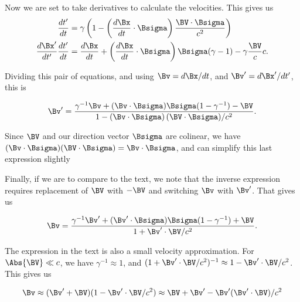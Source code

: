 {Now we are set to take derivatives to calculate the velocities.  This gives us
\begin{subequations}
\begin{equation}\label{eqn:relativisticElectrodynamicsA1:230}
\begin{aligned}
\frac{dt'}{dt} &= \gamma \left( 1 - \left( \frac{d\Bx}{dt} \cdot \Bsigma \right) \frac{\BV \cdot \Bsigma}{c^2} \right) \\
\frac{d\Bx'}{dt'} \frac{d t'}{dt} &= \frac{d\Bx}{dt} + \left(\frac{d\Bx}{dt} \cdot \Bsigma\right) \Bsigma (\gamma - 1) - \gamma \frac{\BV}{c} c .
\end{aligned}
\end{equation}
\end{subequations}

Dividing this pair of equations, and using \(\Bv = d\Bx/dt\), and \(\Bv' = d\Bx'/dt'\), this is

\begin{equation}\label{eqn:relativisticElectrodynamicsA1:240}
\Bv' = \frac{\gamma^{-1} \Bv + (\Bv \cdot \Bsigma) \Bsigma (1 - \gamma^{-1}) - \BV}{ 1 - \left( \Bv \cdot \Bsigma \right) (\BV \cdot \Bsigma)/c^2 }.
\end{equation}

Since \(\BV\) and our direction vector \(\Bsigma\) are colinear, we have \((\Bv \cdot \Bsigma) (\BV \cdot \Bsigma) = \Bv \cdot \Bsigma\), and can simplify this last expression slightly


Finally, if we are to compare to the text, we note that the inverse expression requires replacement of \(\BV\) with \(-\BV\) and switching \(\Bv\) with \(\Bv'\).  That gives us

\begin{equation}\label{eqn:relativisticElectrodynamicsA1:250i}
\Bv = \frac{\gamma^{-1} \Bv' + (\Bv' \cdot \Bsigma) \Bsigma (1 - \gamma^{-1}) + \BV}{ 1 + \Bv' \cdot \BV/c^2 }.
\end{equation}

The expression in the text is also a small velocity approximation.  For \(\Abs{\BV} \ll c\), we have \(\gamma^{-1} \approx 1\), and \((1 + \Bv' \cdot \BV/c^2)^{-1} \approx 1 - \Bv' \cdot \BV/c^2\).  This gives us

\begin{equation}\label{eqn:relativisticElectrodynamicsA1:250a}
\Bv \approx (\Bv' + \BV)( 1 - \Bv' \cdot \BV/c^2 ) \approx \BV + \Bv' - \Bv' (\Bv' \cdot \BV)/c^2
\end{equation}

}
